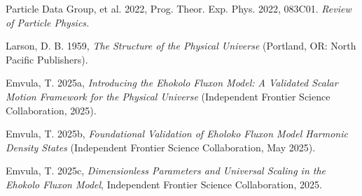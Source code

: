 \documentclass[11pt]{article}
\begin{document}

\begin{thebibliography}{99}
\raggedright
{}
Particle Data Group, et al. 2022, Prog. Theor. Exp. Phys. 2022, 083C01. 
\textit{Review of Particle Physics.}

Larson, D. B. 1959, \textit{The Structure of the Physical Universe} (Portland, OR: North Pacific Publishers).

Emvula, T. 2025a, \textit{Introducing the Ehokolo Fluxon Model: A Validated Scalar Motion Framework for the Physical Universe} (Independent Frontier Science Collaboration, 2025). 

Emvula, T. 2025b, \textit{Foundational Validation of Eholoko Fluxon Model Harmonic Density States} (Independent Frontier Science Collaboration, May 2025).

Emvula, T. 2025c, \textit{Dimensionless Parameters and Universal Scaling in the Ehokolo Fluxon Model}, Independent Frontier Science Collaboration, 2025.

\end{thebibliography}
\end{document}
